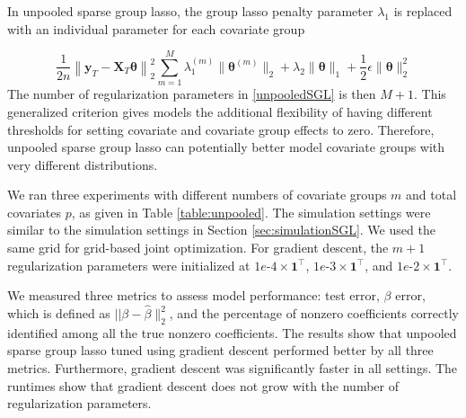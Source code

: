 \documentclass[10pt,letterpaper]{article}
\begin{document}
In unpooled sparse group lasso, the group lasso penalty parameter $\lambda_1$ is replaced with an individual parameter for each covariate group

\begin{equation}
\frac{1}{2n} 
\left \| \boldsymbol{y}_T - \boldsymbol{X}_T \boldsymbol{\theta} \right \|^2_2
\sum_{m=1}^M \lambda_1^{(m)} \| \boldsymbol \theta^{(m)} \|_2
+ \lambda_2 \| \boldsymbol \theta \|_1
+ \frac{1}{2} \epsilon \| \boldsymbol\theta \|_2^2
\label{unpooledSGL}
\end{equation}
The number of regularization parameters in \eqref{unpooledSGL} is then $M+1$. This generalized criterion gives models the additional flexibility of having different thresholds for setting covariate and covariate group effects to zero. Therefore, unpooled sparse group lasso can potentially better model covariate groups with very different distributions.

We ran three experiments with different numbers of covariate groups $m$ and total covariates $p$, as given in Table \ref{table:unpooled}. The simulation settings were similar to the simulation settings in Section \ref{sec:simulationSGL}. We used the same grid for grid-based joint optimization. For gradient descent, the $m+1$ regularization parameters were initialized at $1e\text{-}4 \times \boldsymbol 1^\top$, $1e\text{-}3 \times \boldsymbol 1^\top$, and $1e\text{-}2 \times \boldsymbol 1^\top$.

We measured three metrics to assess model performance: test error, $\beta$ error, which is defined as $\lvert \lvert \beta - \hat \beta \|_2 ^2$, and the percentage of nonzero coefficients correctly identified among all the true nonzero coefficients. The results show that unpooled sparse group lasso tuned using gradient descent performed better by all three metrics. Furthermore, gradient descent was significantly faster in all settings. The runtimes show that gradient descent does not grow with the number of regularization parameters.
\end{document}
